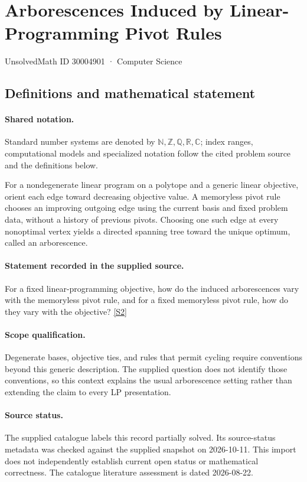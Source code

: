 \documentclass[11pt]{article}
\newcommand{\sref}[2]{\hyperlink{source:#1:#2}{[S#2]}}
\begin{document}
\setcounter{section}{30004900}
\section{Arborescences Induced by Linear-Programming Pivot Rules}\label{30004901}
{\small\sffamily UnsolvedMath ID 30004901 · Computer Science}
\subsection{Definitions and mathematical statement}

\paragraph{Shared notation.}Standard number systems are denoted by $\mathbb N,\mathbb Z,\mathbb Q,\mathbb R,\mathbb C$; index ranges, computational models and specialized notation follow the cited problem source and the definitions below.


For a nondegenerate linear program on a polytope and a generic linear objective, orient each edge toward decreasing objective value. A memoryless pivot rule chooses an improving outgoing edge using the current basis and fixed problem data, without a history of previous pivots. Choosing one such edge at every nonoptimal vertex yields a directed spanning tree toward the unique optimum, called an arborescence.
\paragraph{Statement recorded in the supplied source.}
For a fixed linear-programming objective, how do the induced arborescences vary with the memoryless pivot rule, and for a fixed memoryless pivot rule, how do they vary with the objective? \sref{30004901}{2}
\paragraph{Scope qualification.}
Degenerate bases, objective ties, and rules that permit cycling require conventions beyond this generic description. The supplied question does not identify those conventions, so this context explains the usual arborescence setting rather than extending the claim to every LP presentation.
\paragraph{Source status.}
The supplied catalogue labels this record partially solved. Its source-status metadata was checked against the supplied snapshot on 2026-10-11. This import does not independently establish current open status or mathematical correctness. The catalogue literature assessment is dated 2026-08-22.
\end{document}
